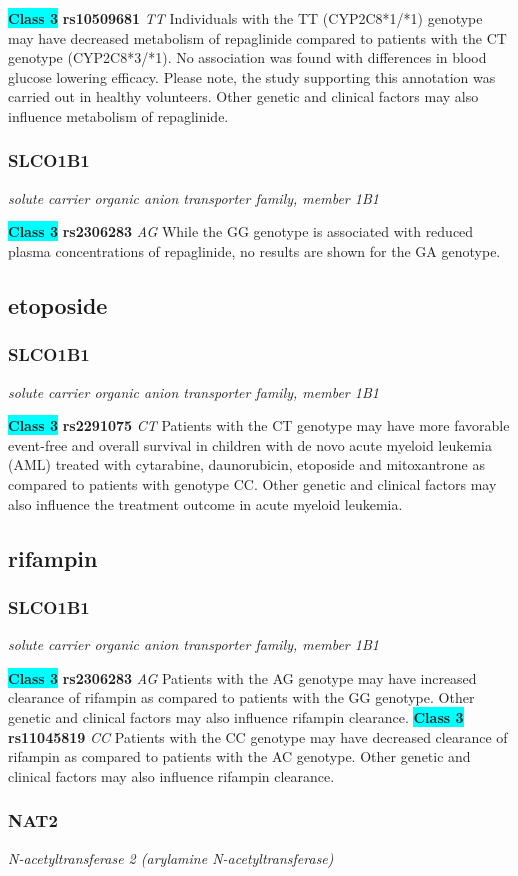 \documentclass{report}
\begin{document}
\textbf{\colorbox{cyan} {Class 3}} \textbf{ rs10509681 } \textit{ TT }
Individuals with the TT (CYP2C8*1/*1) genotype may have decreased metabolism of repaglinide compared to patients with the CT genotype (CYP2C8*3/*1). No association was found with differences in blood glucose lowering efficacy. Please note, the study supporting this annotation was carried out in healthy volunteers. Other genetic and clinical factors may also influence metabolism of repaglinide.\newline\subsubsection{ SLCO1B1 }
\textit{ solute carrier organic anion transporter family, member 1B1 }

\textbf{\colorbox{cyan} {Class 3}} \textbf{ rs2306283 } \textit{ AG }
While the GG genotype is associated with reduced plasma concentrations of repaglinide, no results are shown for the GA genotype.\newline\subsection{ etoposide }\subsubsection{ SLCO1B1 }
\textit{ solute carrier organic anion transporter family, member 1B1 }

\textbf{\colorbox{cyan} {Class 3}} \textbf{ rs2291075 } \textit{ CT }
Patients with the CT genotype may have more favorable event-free and overall survival in children with de novo acute myeloid leukemia (AML) treated with cytarabine, daunorubicin, etoposide and mitoxantrone as compared to patients with genotype CC. Other genetic and clinical factors may also influence the treatment outcome in acute myeloid leukemia.\newline\subsection{ rifampin }\subsubsection{ SLCO1B1 }
\textit{ solute carrier organic anion transporter family, member 1B1 }

\textbf{\colorbox{cyan} {Class 3}} \textbf{ rs2306283 } \textit{ AG }
Patients with the AG genotype may have increased clearance of rifampin as compared to patients with the GG genotype. Other genetic and clinical factors may also influence rifampin clearance. \newline\textbf{\colorbox{cyan} {Class 3}} \textbf{ rs11045819 } \textit{ CC }
Patients with the CC genotype may have decreased clearance of rifampin as compared to patients with the AC genotype. Other genetic and clinical factors may also influence rifampin clearance. \newline\subsubsection{ NAT2 }
\textit{ N-acetyltransferase 2 (arylamine N-acetyltransferase) }
\end{document}
